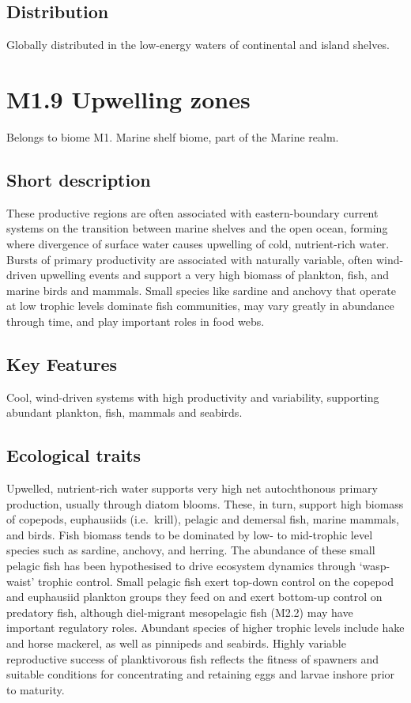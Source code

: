 \documentclass[
  letterpaper,
  DIV=11,
  numbers=noendperiod]{scrartcl}
\begin{document}
\subsection{Distribution}\label{distribution-33}

Globally distributed in the low-energy waters of continental and island
shelves.

\section{M1.9 Upwelling zones}\label{m1.9-upwelling-zones}

Belongs to biome M1. Marine shelf biome, part of the Marine realm.

\subsection{Short description}\label{short-description-34}

These productive regions are often associated with eastern-boundary
current systems on the transition between marine shelves and the open
ocean, forming where divergence of surface water causes upwelling of
cold, nutrient-rich water. Bursts of primary productivity are associated
with naturally variable, often wind-driven upwelling events and support
a very high biomass of plankton, fish, and marine birds and mammals.
Small species like sardine and anchovy that operate at low trophic
levels dominate fish communities, may vary greatly in abundance through
time, and play important roles in food webs.

\subsection{Key Features}\label{key-features-34}

Cool, wind-driven systems with high productivity and variability,
supporting abundant plankton, fish, mammals and seabirds.

\subsection{Ecological traits}\label{ecological-traits-34}

Upwelled, nutrient-rich water supports very high net autochthonous
primary production, usually through diatom blooms. These, in turn,
support high biomass of copepods, euphausiids (i.e.~krill), pelagic and
demersal fish, marine mammals, and birds. Fish biomass tends to be
dominated by low- to mid-trophic level species such as sardine, anchovy,
and herring. The abundance of these small pelagic fish has been
hypothesised to drive ecosystem dynamics through `wasp-waist' trophic
control. Small pelagic fish exert top-down control on the copepod and
euphausiid plankton groups they feed on and exert bottom-up control on
predatory fish, although diel-migrant mesopelagic fish (M2.2) may have
important regulatory roles. Abundant species of higher trophic levels
include hake and horse mackerel, as well as pinnipeds and seabirds.
Highly variable reproductive success of planktivorous fish reflects the
fitness of spawners and suitable conditions for concentrating and
retaining eggs and larvae inshore prior to maturity.
\end{document}
